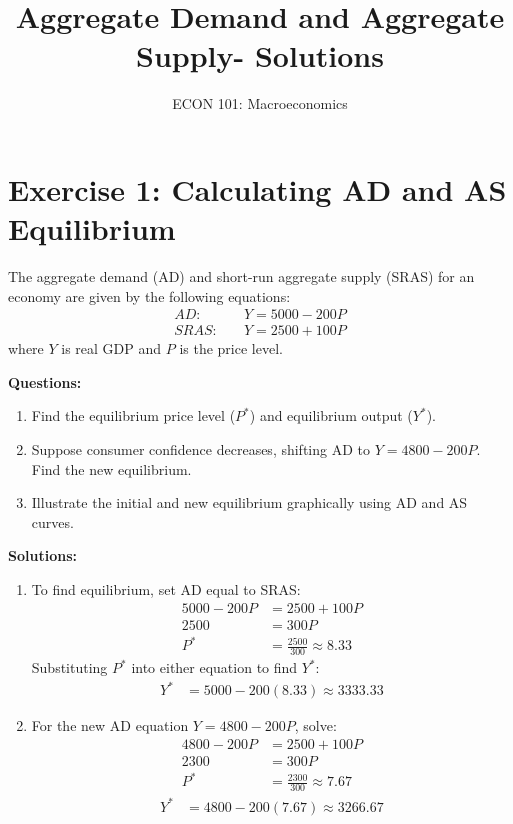 \documentclass{article}
\begin{document}
\title{Aggregate Demand and Aggregate Supply- Solutions}
\author{ECON 101: Macroeconomics}
\date{}
\maketitle

\section*{Exercise 1: Calculating AD and AS Equilibrium}
The aggregate demand (AD) and short-run aggregate supply (SRAS) for an economy are given by the following equations:
\begin{align*}
    AD: & \quad Y = 5000 - 200P \\
    SRAS: & \quad Y = 2500 + 100P
\end{align*}
where \(Y\) is real GDP and \(P\) is the price level.

\textbf{Questions:}
\begin{enumerate}
    \item Find the equilibrium price level (\(P^*\)) and equilibrium output (\(Y^*\)).
    \item Suppose consumer confidence decreases, shifting AD to \( Y = 4800 - 200P \). Find the new equilibrium.
    \item Illustrate the initial and new equilibrium graphically using AD and AS curves.
\end{enumerate}

\textbf{Solutions:}
\begin{enumerate}
    \item To find equilibrium, set AD equal to SRAS:
    \begin{align*}
        5000 - 200P &= 2500 + 100P \\
        2500 &= 300P \\
        P^* &= \frac{2500}{300} \approx 8.33
    \end{align*}
    Substituting \(P^*\) into either equation to find \(Y^*\):
    \begin{align*}
        Y^* &= 5000 - 200(8.33) \approx 3333.33
    \end{align*}
    
    \item For the new AD equation \( Y = 4800 - 200P \), solve:
    \begin{align*}
        4800 - 200P &= 2500 + 100P \\
        2300 &= 300P \\
        P^* &= \frac{2300}{300} \approx 7.67
    \end{align*}
    \begin{align*}
        Y^* &= 4800 - 200(7.67) \approx 3266.67
    \end{align*}
\end{enumerate}
\end{document}
